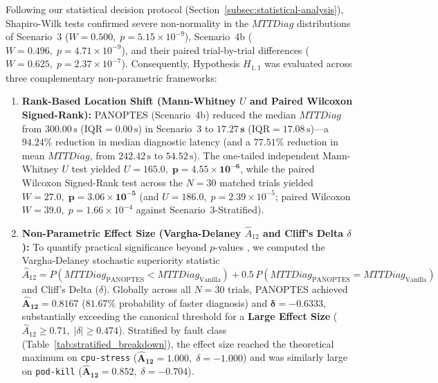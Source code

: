Following our statistical decision protocol (Section~\ref{subsec:statistical-analysis}), Shapiro-Wilk tests confirmed severe non-normality in the $MTTDiag$ distributions of Scenario~3 ($W = 0.500, \; p = 5.15 \times 10^{-9}$), Scenario~4b ($W = 0.496, \; p = 4.71 \times 10^{-9}$), and their paired trial-by-trial differences ($W = 0.625, \; p = 2.37 \times 10^{-7}$). Consequently, Hypothesis $H_{1,1}$ was evaluated across three complementary non-parametric frameworks:

\begin{enumerate}
    \item \textbf{Rank-Based Location Shift (Mann-Whitney $U$ and Paired Wilcoxon Signed-Rank):} PANOPTES (Scenario~4b) reduced the median $MTTDiag$ from $300.00\,\text{s}$ ($\text{IQR} = 0.00\,\text{s}$) in Scenario~3 to $\mathbf{17.27\,\text{s}}$ ($\text{IQR} = 17.08\,\text{s}$)---a $\mathbf{94.24\%}$ reduction in median diagnostic latency (and a $77.51\%$ reduction in mean $MTTDiag$, from $242.42\,\text{s}$ to $54.52\,\text{s}$). The one-tailed independent Mann-Whitney $U$ test yielded $U = 165.0, \; \mathbf{p = 4.55 \times 10^{-6}}$, while the paired Wilcoxon Signed-Rank test across the $N=30$ matched trials yielded $W = 27.0, \; \mathbf{p = 3.06 \times 10^{-5}}$ (and $U = 186.0, \; p = 2.39 \times 10^{-5}$; paired Wilcoxon $W = 39.0, \; p = 1.66 \times 10^{-4}$ against Scenario~3-Stratified).
    
    \item \textbf{Non-Parametric Effect Size (Vargha-Delaney $\hat{A}_{12}$ and Cliff's Delta $\delta$):} To quantify practical significance beyond $p$-values \cite{wohlin_2012}, we computed the Vargha-Delaney stochastic superiority statistic $\hat{A}_{12} = P(MTTDiag_{\text{PANOPTES}} < MTTDiag_{\text{Vanilla}}) + 0.5\,P(MTTDiag_{\text{PANOPTES}} = MTTDiag_{\text{Vanilla}})$ and Cliff's Delta ($\delta$). Globally across all $N=30$ trials, PANOPTES achieved $\mathbf{\hat{A}_{12} = 0.8167}$ ($81.67\%$ probability of faster diagnosis) and $\mathbf{\delta = -0.6333}$, substantially exceeding the canonical threshold for a \textbf{Large Effect Size} ($\hat{A}_{12} \ge 0.71, \; |\delta| \ge 0.474$). Stratified by fault class (Table~\ref{tab:stratified_breakdown}), the effect size reached the theoretical maximum on \texttt{cpu-stress} ($\mathbf{\hat{A}_{12} = 1.000}, \; \delta = -1.000$) and was similarly large on \texttt{pod-kill} ($\mathbf{\hat{A}_{12} = 0.852}, \; \delta = -0.704$).
    

\end{enumerate}
